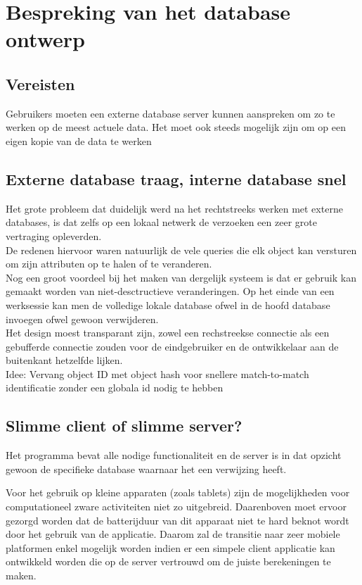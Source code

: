 \chapter{Bespreking van het database ontwerp}
\label{hoofdstuk:database}

\section{Vereisten}
Gebruikers moeten een externe database server kunnen aanspreken om zo te werken op de meest actuele data. Het moet ook steeds mogelijk zijn om op een eigen kopie van de data te werken

\section{Externe database traag, interne database snel}
Het grote probleem dat duidelijk werd na het rechtstreeks werken met externe databases, is dat zelfs op een lokaal netwerk de verzoeken een zeer grote vertraging opleverden.\\

De redenen hiervoor waren natuurlijk de vele queries die elk object kan versturen om zijn attributen op te halen of te veranderen.\\

Nog een groot voordeel bij het maken van dergelijk systeem is dat er gebruik kan gemaakt worden van niet-desctructieve veranderingen. Op het einde van een werksessie kan men de volledige
lokale database ofwel in de hoofd database invoegen ofwel gewoon verwijderen.\\

Het design moest transparant zijn, zowel een rechstreekse connectie als een gebufferde connectie zouden voor de eindgebruiker en de ontwikkelaar aan de buitenkant hetzelfde lijken.\\

Idee: Vervang object ID met object hash voor snellere match-to-match identificatie zonder een globala id nodig te hebben

\section{Slimme client of slimme server?}
Het programma bevat alle nodige functionaliteit en de server is in dat opzicht gewoon de specifieke database waarnaar het een verwijzing heeft.

Voor het gebruik op kleine apparaten (zoals tablets) zijn de mogelijkheden voor computationeel zware activiteiten niet zo uitgebreid. Daarenboven moet ervoor gezorgd worden dat de batterijduur
van dit apparaat niet te hard beknot wordt door het gebruik van de applicatie. Daarom zal de transitie naar zeer mobiele platformen enkel mogelijk worden indien er een simpele client applicatie kan
ontwikkeld worden die op de server vertrouwd om de juiste berekeningen te maken.\\

